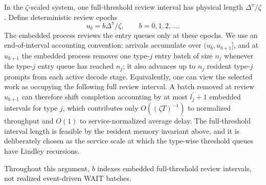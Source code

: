 In the \(\zeta\)-scaled system, one full-threshold review interval has physical length \(\Delta^\pi/\zeta\). Define deterministic review epochs
\[
    u_b=b\Delta^\pi/\zeta,\qquad b=0,1,2,\ldots .
\]
The embedded process reviews the entry queues only at these epochs. We use an end-of-interval accounting convention: arrivals accumulate over \((u_b,u_{b+1}]\), and at \(u_{b+1}\) the embedded process removes one type-\(j\) entry batch of size \(n_j\) whenever the type-\(j\) entry queue has reached \(n_j\); it also advances up to \(n_j\) resident type-\(j\) prompts from each active decode stage. Equivalently, one can view the selected work as occupying the following full review interval. A batch removed at review \(u_{b+1}\) can therefore shift completion accounting by at most \(l_j^\prime+1\) embedded intervals for type \(j\), which contributes only \(O((\zeta T)^{-1})\) to normalized throughput and \(O(1)\) to service-normalized average delay. The full-threshold interval length is feasible by the resident memory invariant above, and it is deliberately chosen as the service scale at which the type-wise threshold queues have Lindley recursions.

Throughout this argument, \(b\) indexes embedded full-threshold review intervals, not realized event-driven WAIT batches.

